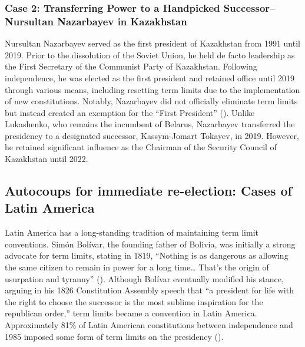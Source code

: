 \documentclass[
  12pt,
]{report}
\begin{document}
\subsubsection*{Case 2: Transferring Power to a Handpicked
Successor--Nursultan Nazarbayev in
Kazakhstan}\label{case-2-transferring-power-to-a-handpicked-successornursultan-nazarbayev-in-kazakhstan}

Nursultan Nazarbayev served as the first president of Kazakhstan from
1991 until 2019. Prior to the dissolution of the Soviet Union, he held
de facto leadership as the First Secretary of the Communist Party of
Kazakhstan. Following independence, he was elected as the first
president and retained office until 2019 through various means,
including resetting term limits due to the implementation of new
constitutions. Notably, Nazarbayev did not officially eliminate term
limits but instead created an exemption for the ``First President''
(). Unlike
Lukashenko, who remains the incumbent of Belarus, Nazarbayev transferred
the presidency to a designated successor, Kassym-Jomart Tokayev, in
2019. However, he retained significant influence as the Chairman of the
Security Council of Kazakhstan until 2022.

\subsection{Autocoups for immediate re-election: Cases of Latin
America}\label{autocoups-for-immediate-re-election-cases-of-latin-america}

Latin America has a long-standing tradition of maintaining term limit
conventions. Simón Bolívar, the founding father of Bolivia, was
initially a strong advocate for term limits, stating in 1819, ``Nothing
is as dangerous as allowing the same citizen to remain in power for a
long time\ldots{} That's the origin of usurpation and tyranny''
(). Although
Bolívar eventually modified his stance, arguing in his 1826 Constitution
Assembly speech that ``a president for life with the right to choose the
successor is the most sublime inspiration for the republican order,''
term limits became a convention in Latin America. Approximately 81\% of
Latin American constitutions between independence and 1985 imposed some
form of term limits on the presidency
().
\end{document}
